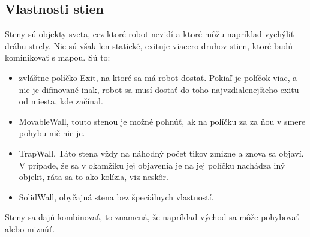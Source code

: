 \subsection{Vlastnosti stien} %
Steny sú objekty sveta, cez ktoré robot nevidí a ktoré môžu napríklad vychýliť dráhu strely. Nie sú však len statické, exituje viacero druhov stien, ktoré budú kominikovať s mapou. Sú to:\\
\begin{itemize}
\item zvláštne políčko Exit, na ktoré sa má robot dostať. Pokiaľ je políčok viac, a nie je difinované inak, robot sa musí dostať do toho najvzdialenejšieho exitu od miesta, kde začínal.
\item MovableWall, touto stenou je možné pohnúť, ak na políčku za za ňou v smere pohybu nič nie je.
\item TrapWall. Táto stena vždy na náhodný počet tikov zmizne a znova sa objaví. V prípade, že sa v okamžiku jej objavenia je na jej políčku nachádza iný objekt, ráta sa to ako kolízia, viz neskôr.%
\item SolidWall, obyčajná stena bez špeciálnych vlastností.
\end {itemize}
Steny sa dajú kombinovať, to znamená, že napríklad východ sa môže pohybovať alebo miznúť. 

